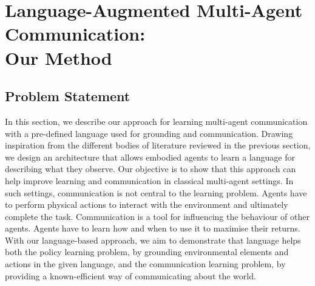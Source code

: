



\section{Language-Augmented Multi-Agent Communication: \\Our Method}\label{sec:LAMAC:Method}

\subsection{Problem Statement}

In this section, we describe our approach for learning multi-agent communication with a pre-defined language used for grounding and communication. 
Drawing inspiration from the different bodies of literature reviewed in the previous section, we design an architecture that allows embodied agents to learn a language for describing what they observe. 
Our objective is to show that this approach can help improve learning and communication in classical multi-agent settings.
In such settings, communication is not central to the learning problem. Agents have to perform physical actions to interact with the environment and ultimately complete the task. 
Communication is a tool for influencing the behaviour of other agents. Agents have to learn how and when to use it to maximise their returns. 
With our language-based approach, we aim to demonstrate that language helps both the policy learning problem, by grounding environmental elements and actions in the given language, and the communication learning problem, by providing a known-efficient way of communicating about the world. 

